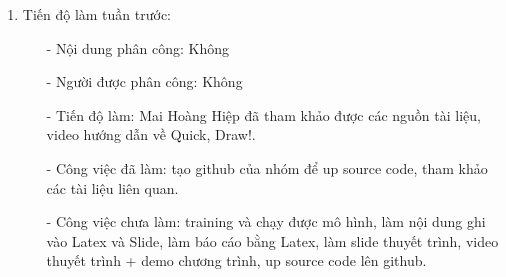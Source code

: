 \begin{enumerate}
\begin{enumerate}
\begin{enumerate}
                \end{enumerate}
            \item Tiến độ làm tuần trước:
                \begin{enumerate}
                    \item[-] Nội dung phân công: Không
                    \item[-] Người được phân công: Không
                    \item[-] Tiến độ làm: Mai Hoàng Hiệp đã tham khảo được các nguồn tài liệu, video hướng dẫn về Quick, Draw!.
                    \item[-] Công việc đã làm: tạo github của nhóm để up source code, tham khảo các tài liệu liên quan.
                    \item[-] Công việc chưa làm: training và chạy được mô hình, làm nội dung ghi vào Latex và Slide, làm báo cáo bằng Latex, làm slide thuyết trình, video thuyết trình + demo chương trình, up source code lên github.
                \end{enumerate}
        \end{enumerate}

\end{enumerate}
